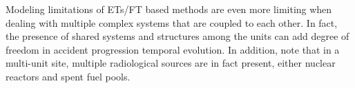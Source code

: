 Modeling limitations of ETs/FT based methods are even more limiting when dealing with 
multiple complex systems that are coupled to each other. In fact, the presence of shared 
systems and structures among the units can add degree of freedom in accident progression 
temporal evolution.
In addition, note that in a multi-unit site, multiple radiological sources are in fact present, 
either nuclear reactors and spent fuel pools. 
 



